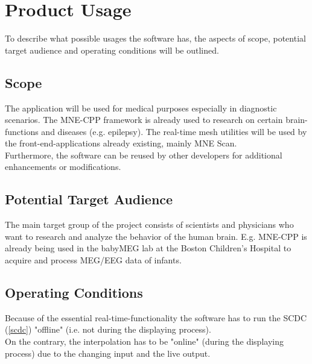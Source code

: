 \section{Product Usage}
To describe what possible usages the software has, the aspects of scope, potential target audience and operating conditions will be outlined. 
\subsection{Scope}\label{3_1_scope}
The application will be used for medical purposes especially in diagnostic scenarios. The MNE-CPP framework is already used to research on certain brain-functions and diseases (e.g. epilepsy). The real-time mesh utilities will be used by the front-end-applications already existing, mainly MNE Scan.\\
Furthermore, the software can be reused by other developers for additional enhancements or modifications.


\subsection{Potential Target Audience}
The main target group of the project consists of scientists and physicians who want to research and analyze the behavior of the human brain. E.g. MNE-CPP is already being used in the babyMEG lab at the Boston Children's Hospital to acquire and process MEG/EEG data of infants.

\subsection{Operating Conditions}
Because of the essential real-time-functionality the software has to run the SCDC (\ref{scdc}) "offline" (i.e. not during the displaying process). \\
On the contrary, the interpolation has to be "online" (during the displaying process) due to the changing input and the live output.
